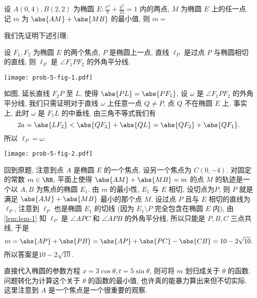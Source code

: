 \begin{prob}
\label{prob:prob-5}
设 $A(0,4), B(2,2)$ 为椭圆 $E: \frac{x^2}{9} + \frac{y^2}{25} = 1$ 内的两点,
$M$ 为椭圆 $E$ 上的任一点.
记 $m$ 为 $\abs{AM} + \abs{MB}$ 的最小值, 则 $m = $
\end{prob}

\begin{soln}
我们先证明下述引理:

\begin{lem}
\label{lem:lem-1}
设 $F_1, F_2$ 为椭圆 $E$ 的两个焦点,
$P$ 是椭圆上一点, 直线 $\ell_P$ 是过点 $P$ 与椭圆相切的直线,
则 $\ell_P$ 是 $\angle F_1PF_2$ 的外角平分线.
\end{lem}

\begin{center}
\texttt{[image: prob-5-fig-1.pdf]}
\end{center}

\begin{subproof}
如图, 延长直线 $F_2P$ 至 $L$, 使得 $\abs{PL} = \abs{PF_1}$,
设 $\omega$ 是 $\angle F_1PF_2$ 的外角平分线,
我们只需证明对于直线 $\omega$ 上任意一点 $Q \ne P$,
点 $Q$ 不在椭圆 $E$ 上.
事实上, 此时 $\omega$ 是 $F_1L$ 的中垂线, 由三角不等式我们有
\[
2a = \abs{LF_2} < \abs{QF_2} + \abs{QL} = \abs{QF_2} + \abs{QF_1}.
\]
所以 $\ell_P = \omega$.
\end{subproof}

\begin{center}
\texttt{[image: prob-5-fig-2.pdf]}
\end{center}

回到原题, 注意到点 $A$ 是椭圆 $E$ 的一个焦点,
设另一个焦点为 $C(0,-4)$. 对固定的常数 $m \in \RR$,
平面上使得 $\abs{AM} + \abs{MB} = m$
的点 $M$ 的轨迹是一个以 $A, B$ 为焦点的椭圆 $E_1$.
由 $m$ 的最小性, $E_1$ 与 $E$ 相切, 设切点为$P$,
则 $P$ 就是满足 $\abs{AM} + \abs{MB}$ 最小的那个点 $M$.
设过点 $P$ 且与 $E$ 相切的直线为 $\ell_P$,
注意到 $\ell_P$ 也是椭圆 $E_1$ 的切线
(因为 $E_1\setminus{P}$ 完全包含在椭圆 $E$ 内),
由 \cref{lem:lem-1} 知 $\ell_P$ 是 $\angle APC$ 和 $\angle APB$ 的外角平分线,
所以只能是 $P, B, C$ 三点共线, 于是
\[
m = \abs{AP} + \abs{PB} = \abs{AP} + \abs{PC} - \abs{CB} = 10 - 2\sqrt{10}.
\]
所以答案是$\boxed{10 - 2\sqrt{10}.}$
\end{soln}

\begin{rem*}
直接代入椭圆的参数方程 $x = 3\cos \theta, t = 5\sin \theta$,
则可将 $m$ 划归成关于 $\theta$ 的函数.
问题转化为计算这个关于 $\theta$ 的函数的最小值,
也许真的能暴力算出来但不切实际.
这里注意到 $A$ 是一个焦点是一个很重要的观察.
\end{rem*}
